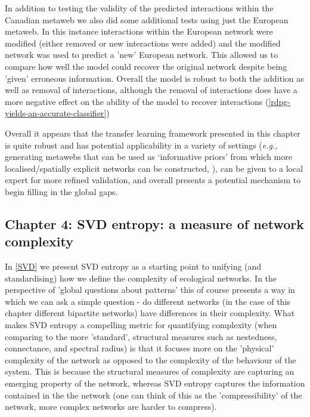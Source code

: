 \begin{refsection}
In addition to testing the validity of the predicted interactions within the Canadian metaweb we also did some additional tests using just the European metaweb. In this instance interactions within the European network were modified (either removed or new interactions were added) and the modified network was used to predict a 'new' European network. This allowed us to compare how well the model could recover the original network despite being 'given' erroneous information. Overall the model is robust to both the addition as well as removal of interactions, although the removal of interactions does have a more negative effect on the ability of the model to recover interactions (\autoref{rdpg-yields-an-accurate-classifier})

Overall it appears that the transfer learning framework presented in this chapter is quite robust and has potential applicability in a variety of settings (\emph{e.g.,} generating metawebs that can be used as `informative priors' from which more localised/spatially explicit networks can be constructed, \cite{Cirtwill2019QuaFra}), can be given to a local expert for more refined validation, and overall presents a potential mechanism to begin filling in the global gaps.

\subsection{Chapter 4: SVD entropy: a measure of network complexity}

In \autoref{SVD} we present SVD entropy as a starting point to
unifying (and standardising) how we define the complexity of ecological
networks. In the perspective of 'global questions about patterns' this of course presents a way in which we can ask a simple question - do different networks (in the case of this chapter different bipartite networks) have differences in their complexity. What makes SVD entropy a compelling metric for quantifying complexity (when comparing to the more 'standard', structural measures such as nestedness, connectance, and spectral radius) is that it focuses more on the 'physical' complexity of the network as opposed to the complexity of the behaviour of the system. This is because the structural measures of complexity are capturing an emerging property of the network, whereas SVD entropy captures the information contained in the the network (one can think of this as the 'compressibility' of the network, more complex networks are harder to compress).


\end{refsection}
